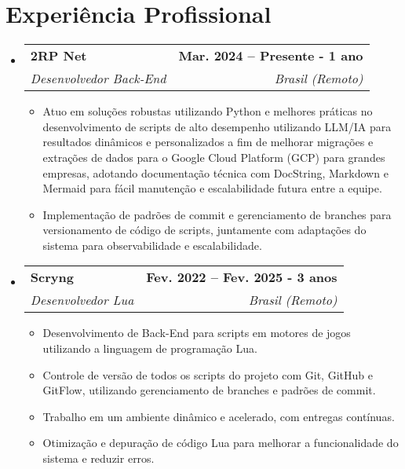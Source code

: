 \documentclass[letterpaper,11pt]{article}
\makeatletter
\newcommand{\resumeItem}[1]{
  \item\small{
    {#1 \vspace{-2pt}}
  }
}
\newcommand{\resumeSubheading}[4]{
  \vspace{-2pt}\item
    \begin{tabular*}{1.0\textwidth}[t]{l@{\extracolsep{\fill}}r}
      \textbf{#1} & \textbf{\small #2} \\
      \textit{\small#3} & \textit{\small #4} \\
    \end{tabular*}\vspace{-7pt}
}
\newcommand{\resumeSubHeadingListStart}{\begin{itemize}[leftmargin=0.0in, label={}]}
\newcommand{\resumeSubHeadingListEnd}{\end{itemize}}
\newcommand{\resumeItemListStart}{\begin{itemize}}
\newcommand{\resumeItemListEnd}{\end{itemize}\vspace{-5pt}}
\makeatother
\begin{document}
\section{Experiência Profissional}
  \resumeSubHeadingListStart

    \resumeSubheading
      {2RP Net}{Mar. 2024 -- Presente - 1 ano}
      {Desenvolvedor Back-End}{Brasil (Remoto)}
      \resumeItemListStart
        \resumeItem{Atuo em soluções robustas utilizando Python e melhores práticas no desenvolvimento de scripts de alto desempenho utilizando LLM/IA para resultados dinâmicos e personalizados a fim de melhorar migrações e extrações de dados para o Google Cloud Platform (GCP) para grandes empresas, adotando documentação técnica com DocString, Markdown e Mermaid para fácil manutenção e escalabilidade futura entre a equipe.}
        \resumeItem{Implementação de padrões de commit e gerenciamento de branches para versionamento de código de scripts, juntamente com adaptações do sistema para observabilidade e escalabilidade.}
      \resumeItemListEnd
      
    \resumeSubheading
      {Scryng}{Fev. 2022 -- Fev. 2025 - 3 anos}
      {Desenvolvedor Lua}{Brasil (Remoto)}
      \resumeItemListStart
        \resumeItem{Desenvolvimento de Back-End para scripts em motores de jogos utilizando a linguagem de programação Lua.}
        \resumeItem{Controle de versão de todos os scripts do projeto com Git, GitHub e GitFlow, utilizando gerenciamento de branches e padrões de commit.}
        \resumeItem{Trabalho em um ambiente dinâmico e acelerado, com entregas contínuas.}
        \resumeItem{Otimização e depuração de código Lua para melhorar a funcionalidade do sistema e reduzir erros.}
      \resumeItemListEnd

  \resumeSubHeadingListEnd
\vspace{-16pt}

\end{document}
